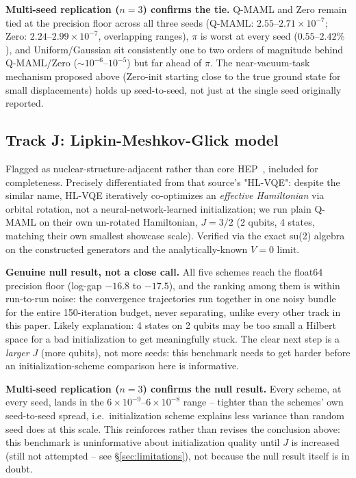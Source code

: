 \documentclass[11pt]{article}
\begin{document}
\begin{keyresult}
\textbf{Multi-seed replication ($n{=}3$) confirms the tie.} Q-MAML and Zero remain tied at the precision
floor across all three seeds (Q-MAML: $2.55$--$2.71\times10^{-7}$; Zero: $2.24$--$2.99\times10^{-7}$,
overlapping ranges), $\pi$ is worst at every seed ($0.55$--$2.42\%$), and Uniform/Gaussian sit consistently
one to two orders of magnitude behind Q-MAML/Zero ($\sim10^{-6}$--$10^{-5}$) but far ahead of $\pi$. The
near-vacuum-task mechanism proposed above (Zero-init starting close to the true ground state for small
displacements) holds up seed-to-seed, not just at the single seed originally reported.
\end{keyresult}

\FloatBarrier
\subsection{Track J: Lipkin-Meshkov-Glick model}
\label{sec:track-j}
Flagged as nuclear-structure-adjacent rather than core HEP~\citep{hlvqe2023}, included for completeness.
Precisely differentiated from that source's "HL-VQE": despite the similar name, HL-VQE iteratively
co-optimizes an \emph{effective Hamiltonian} via orbital rotation, not a neural-network-learned
initialization; we run plain Q-MAML on their own un-rotated Hamiltonian, $J{=}3/2$ (2 qubits, 4 states,
matching their own smallest showcase scale). Verified via the exact su(2) algebra on the constructed
generators and the analytically-known $V{=}0$ limit.

\begin{keyresult}
\textbf{Genuine null result, not a close call.} All five schemes reach the float64 precision floor
(log-gap $-16.8$ to $-17.5$), and the ranking among them is within run-to-run noise: the convergence
trajectories run together in one noisy bundle for the entire 150-iteration budget, never separating,
unlike every other track in this paper. Likely explanation: 4 states on 2 qubits may be too small a
Hilbert space for a bad initialization to get meaningfully stuck. The clear next step is a \emph{larger}
$J$ (more qubits), not more seeds: this benchmark needs to get harder before an initialization-scheme
comparison here is informative.
\end{keyresult}

\begin{keyresult}
\textbf{Multi-seed replication ($n{=}3$) confirms the null result.} Every scheme, at every seed, lands in
the $6\times10^{-9}$--$6\times10^{-8}$ range -- tighter than the schemes' own seed-to-seed spread, i.e.\
initialization scheme explains less variance than random seed does at this scale. This reinforces rather
than revises the conclusion above: this benchmark is uninformative about initialization quality until $J$
is increased (still not attempted -- see \S\ref{sec:limitations}), not because the null result itself is in
doubt.
\end{keyresult}
\end{document}
